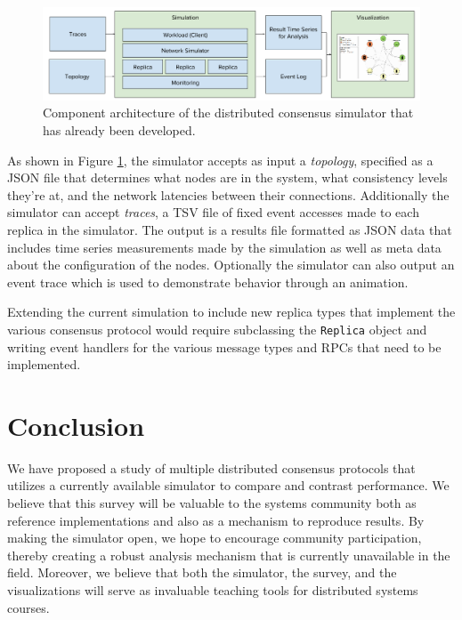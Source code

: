 \documentclass[11pt,letterpaper]{article}
\begin{document}
\begin{figure}
	\centering
    \includegraphics[width=\textwidth]{figures/simulator}
    \caption{\textsf{Component architecture of the distributed consensus simulator that has already been developed.}}
    \label{fig:architecture}
\end{figure}

As shown in Figure \ref{fig:architecture}, the simulator accepts as input a \textit{topology}, specified as a JSON file that determines what nodes are in the system, what consistency levels they're at, and the network latencies between their connections. Additionally the simulator can accept \textit{traces}, a TSV file of fixed event accesses made to each replica in the simulator. The output is a results file formatted as JSON data that includes time series measurements made by the simulation as well as meta data about the configuration of the nodes. Optionally the simulator can also output an event trace which is used to demonstrate behavior through an animation.

Extending the current simulation to include new replica types that implement the various consensus protocol would require subclassing the \texttt{Replica} object and writing event handlers for the various message types and RPCs that need to be implemented.

\section*{Conclusion}

We have proposed a study of multiple distributed consensus protocols that utilizes a currently available simulator to compare and contrast performance. We believe that this survey will be valuable to the systems community both as reference implementations and also as a mechanism to reproduce results. By making the simulator open, we hope to encourage community participation, thereby creating a robust analysis mechanism that is currently unavailable in the field. Moreover, we believe that both the simulator, the survey, and the visualizations will serve as invaluable teaching tools for distributed systems courses.




\end{document}
